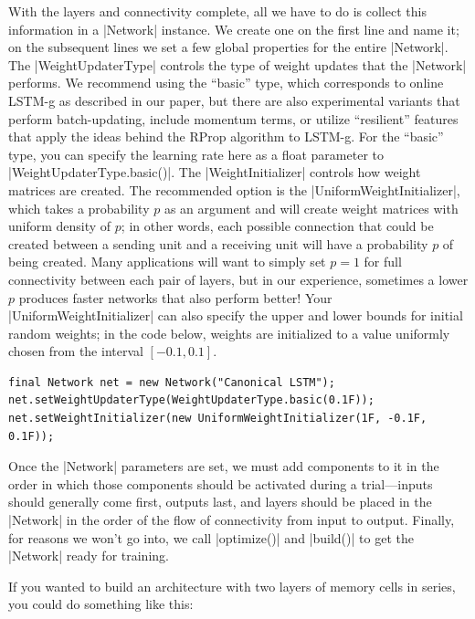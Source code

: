 \documentclass{article}
\begin{document}
With the layers and connectivity complete, all we have to do is collect this information in a 
|Network| instance. We create one on the first line and name it; on the subsequent lines we set a few global properties for the entire |Network|. The |WeightUpdaterType| controls the type of weight updates that the |Network| performs. We recommend using the ``basic'' type, which corresponds to online LSTM-g as described in our paper, but there are also experimental variants that perform batch-updating, include momentum terms, or utilize ``resilient'' features that apply the
ideas behind the RProp algorithm to LSTM-g. For the ``basic'' type, you can specify the learning rate here as a float parameter to |WeightUpdaterType.basic()|. The |WeightInitializer| controls how weight matrices are created. The recommended option is the |UniformWeightInitializer|, which takes a probability $p$ as an argument and will create weight matrices with uniform density of $p$; in other words, each possible connection that could be created between a sending unit and a receiving unit will have a probability $p$ of being created. Many applications will want to simply set $p = 1$ for full connectivity between each pair of layers, but in our experience, sometimes a lower $p$ produces faster networks that also perform better! Your |UniformWeightInitializer| can also specify the upper and lower bounds for initial random weights; in the code below, weights are initialized to a value uniformly chosen from the interval $[-0.1, 0.1]$.

\begin{verbatim}
final Network net = new Network("Canonical LSTM");
net.setWeightUpdaterType(WeightUpdaterType.basic(0.1F));
net.setWeightInitializer(new UniformWeightInitializer(1F, -0.1F, 0.1F));
\end{verbatim}

Once the |Network| parameters are set, we must add components to it in the order in which those 
components should be activated during a trial---inputs should generally come first, outputs last, and
layers should be placed in the |Network| in the order of the flow of connectivity from input to
output. Finally, for reasons we won't go into, we call  |optimize()| and  |build()| to get the |Network|
ready for training.

If you wanted to build an architecture with two layers of memory cells in series, you could do
something like this:
\end{document}
